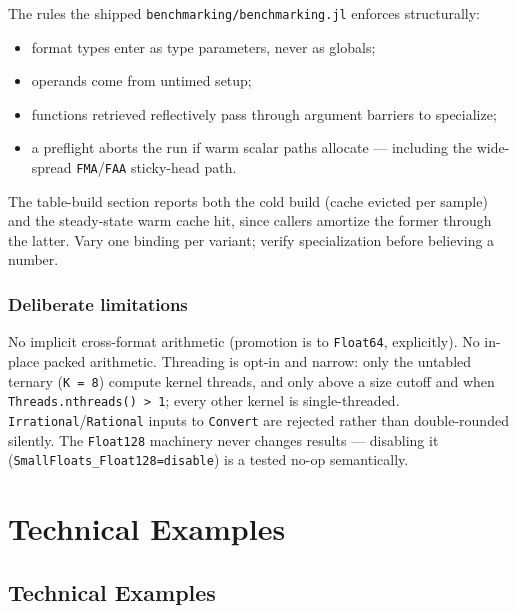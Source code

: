 The rules the shipped \texttt{benchmarking/benchmarking.jl} enforces structurally:



\begin{itemize}
\item format types enter as type parameters, never as globals;


\item operands come from untimed setup;


\item functions retrieved reflectively pass through argument barriers to specialize;


\item a preflight aborts the run if warm scalar paths allocate — including the wide-spread \texttt{FMA}/\texttt{FAA} sticky-head path.

\end{itemize}


The table-build section reports both the cold build (cache evicted per sample) and the steady-state warm cache hit, since callers amortize the former through the latter. Vary one binding per variant; verify specialization before believing a number.



\section{Deliberate limitations}



\label{16229184572553167566}{}


No implicit cross-format arithmetic (promotion is to \texttt{Float64}, explicitly). No in-place packed arithmetic. Threading is opt-in and narrow: only the untabled ternary (\texttt{K = 8}) compute kernel threads, and only above a size cutoff and when \texttt{Threads.nthreads() > 1}; every other kernel is single-threaded. \texttt{Irrational}/\texttt{Rational} inputs to \texttt{Convert} are rejected rather than double-rounded silently. The \texttt{Float128} machinery never changes results — disabling it (\texttt{SmallFloats\_Float128=disable}) is a tested no-op semantically.



\part{Technical Examples}


\chapter{Technical Examples}



